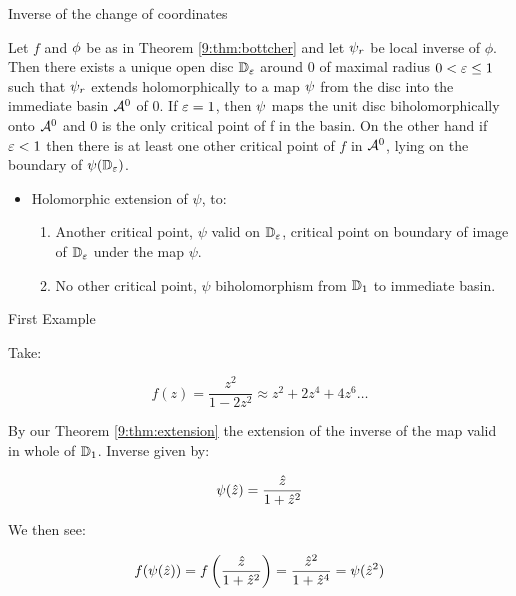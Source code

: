 \begin{frame}{Inverse of the change of coordinates}

\begin{thm}
\label{9:thm:extension}
Let $f$ and $\phi$ be as in Theorem \ref{9:thm:bottcher} and let $\psi_r$ be local inverse of $\phi$. Then there exists a unique open disc $\mathbb{D}_{\varepsilon}$ around 0 of maximal radius $0<\varepsilon \leq 1$ such that $\psi_r$ extends holomorphically to a map $\psi$ from the disc into the immediate basin $\mathcal{A}^0$ of $0$. If $\varepsilon=1$, then $\psi$ maps the unit disc biholomorphically onto $\mathcal{A}^0$ and $0$ is the only critical point of f in the basin. On the other hand if $\varepsilon<1$ then there is at least one other critical point of $f$ in $\mathcal{A}^0$, lying on the boundary of $\psi(\mathbb{D}_{\varepsilon})$.
\end{thm}\bigskip
    
    \begin{itemize}
        \item Holomorphic extension of $\psi$, to:
        \begin{enumerate}
            \item Another critical point, $\psi$ valid on $\mathbb{D}_{\varepsilon}$, critical point on boundary of image of $\mathbb{D}_{\varepsilon}$ under the map $\psi$.
            
            \item No other critical point, $\psi$ biholomorphism from $\mathbb{D}_1$ to immediate basin.
        \end{enumerate}

    \end{itemize}
    
\end{frame}



\begin{frame}{First Example}

\begin{exl}

Take:

$$f(z) = \frac{z^2}{1-2z^2} \approx z^2+2z^4+4z^6\dots$$


By our Theorem \ref{9:thm:extension} the extension of the inverse of the map valid in whole of $\mathbb{D}_1$. Inverse given by:


$$\psi(\hat{z}) = \frac{\hat{z}}{1+\hat{z}^2}$$

We then see:

$$f(\psi(\hat{z})) = f\left(\frac{\hat{z}}{1+\hat{z}^2}\right) = \frac{\hat{z}^2}{1+\hat{z}^4} = \psi(\hat{z}^2)$$
\end{exl}
    
\end{frame}


